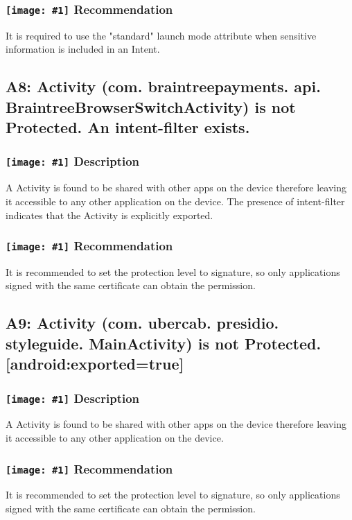 \documentclass[12p]{article}
\newcommand{\icon}[1]{\texttt{[image: \#1]}}
\begin{document}
\subsubsection*{\protect\icon{/home/miki/Documents/GITHUB/AndroidPermissions/python/vulns/report_icons/basic_todo.png} Recommendation}
It is required to use the "standard" launch mode attribute when sensitive information is included in an Intent.
\subsection{A8: Activity (com. braintreepayments. api. BraintreeBrowserSwitchActivity) is not Protected. An intent-filter exists.}
\subsubsection*{\protect\icon{/home/miki/Documents/GITHUB/AndroidPermissions/python/vulns/report_icons/basic_sheet.png} Description}
A  Activity is found to be shared with other apps on the device therefore leaving it accessible to any other application on the device. The presence of intent-filter indicates that the Activity is explicitly exported.
\subsubsection*{\protect\icon{/home/miki/Documents/GITHUB/AndroidPermissions/python/vulns/report_icons/basic_todo.png} Recommendation}
It is recommended to set the protection level to signature, so only applications signed with the same certificate can obtain the permission.
\subsection{A9: Activity (com. ubercab. presidio. styleguide. MainActivity) is not Protected. [android:exported=true]}
\subsubsection*{\protect\icon{/home/miki/Documents/GITHUB/AndroidPermissions/python/vulns/report_icons/basic_sheet.png} Description}
A Activity is found to be shared with other apps on the device therefore leaving it accessible to any other application on the device.
\subsubsection*{\protect\icon{/home/miki/Documents/GITHUB/AndroidPermissions/python/vulns/report_icons/basic_todo.png} Recommendation}
It is recommended to set the protection level to signature, so only applications signed with the same certificate can obtain the permission.
\end{document}
